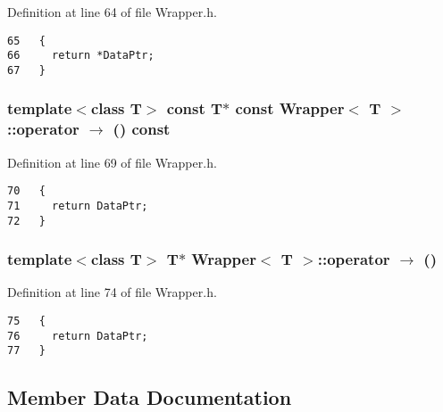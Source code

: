 Definition at line 64 of file Wrapper.h.

\begin{Code}\begin{verbatim}65   {
66     return *DataPtr;
67   }
\end{verbatim}
\end{Code}


\subsubsection{\setlength{\rightskip}{0pt plus 5cm}template$<$class T$>$ const T$\ast$ const {\bf Wrapper}$<$ T $>$::operator $\rightarrow$  () const\hspace{0.3cm}{\tt  [inline]}}\label{classWrapper_da2ce054a40a86d0a03d9bc339152736}




Definition at line 69 of file Wrapper.h.

\begin{Code}\begin{verbatim}70   {
71     return DataPtr;
72   }
\end{verbatim}
\end{Code}


\subsubsection{\setlength{\rightskip}{0pt plus 5cm}template$<$class T$>$ T$\ast$ {\bf Wrapper}$<$ T $>$::operator $\rightarrow$  ()\hspace{0.3cm}{\tt  [inline]}}\label{classWrapper_44a92ec32cd70089debea7205b2cc0a8}




Definition at line 74 of file Wrapper.h.

\begin{Code}\begin{verbatim}75   {
76     return DataPtr;
77   }
\end{verbatim}
\end{Code}




\subsection{Member Data Documentation}
